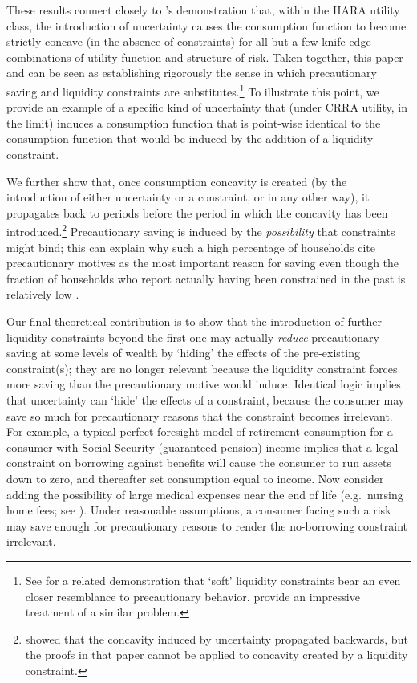 These results connect closely to \citet{carroll&kimball:concavity}'s demonstration that, within the HARA utility class, the introduction of uncertainty causes the consumption function to become strictly concave (in the absence of constraints) for all but a few knife-edge combinations of utility function and structure of risk.  Taken together, this paper and \citet{carroll&kimball:concavity} can be seen as establishing rigorously the sense in which precautionary saving and liquidity  constraints are substitutes.\footnote{See \citet{fernandez-corugedo:softlc} for a related demonstration that `soft' liquidity constraints bear an even closer resemblance to precautionary behavior. \citet{MendelsonAmihud:consumption} provide an impressive treatment of a similar problem.} To illustrate this point, we provide an example of a specific kind of uncertainty that (under CRRA utility, in the limit) induces a consumption function that is point-wise identical to the consumption function that would be induced by the addition of a liquidity constraint.

We further show that, once consumption concavity is created (by the introduction of either uncertainty or a constraint, or in any other way), it propagates back to periods before the period in which the concavity has been introduced.\footnote{\citet{carroll&kimball:concavity} showed that the concavity induced by uncertainty propagated backwards, but the proofs in that paper cannot be applied to concavity created by a liquidity constraint.} Precautionary saving is induced by the \textit{possibility} that constraints might bind; this can explain why such a high percentage of households cite precautionary motives as the most important reason for saving \citep{kennickell&lusardi:scfquestions} even though the fraction of households who report actually having been constrained in the past is relatively low \citep{jappelli:whoisconstr}.

Our final theoretical contribution is to show that the introduction of further liquidity constraints beyond the first one may actually \textit{reduce} precautionary saving at some levels of wealth by `hiding' the effects of the pre-existing constraint(s); they are no longer relevant because the liquidity constraint forces more saving than the precautionary motive would induce. Identical logic implies that uncertainty can `hide' the effects of a constraint, because the consumer may save so much for precautionary reasons that the constraint becomes irrelevant. For example, a typical perfect foresight model of retirement consumption for a consumer with Social Security (guaranteed pension) income implies that a legal constraint on borrowing against benefits will cause the consumer to run assets down to zero, and thereafter set consumption equal to income.  Now consider adding the possibility of large medical expenses near the end of life (e.g.\ nursing home fees; see \citealp{aclvJoy}).  Under reasonable assumptions, a consumer facing such a risk may save enough for precautionary reasons to render the no-borrowing constraint irrelevant.

